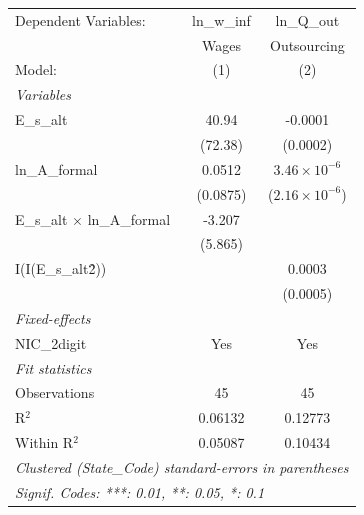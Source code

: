 
\begingroup
\centering
\begin{tabular}{lcc}
   \tabularnewline \midrule \midrule
   Dependent Variables:                  & ln\_w\_inf   & ln\_Q\_out\\    
                                         & Wages        & Outsourcing \\   
   Model:                                & (1)          & (2)\\  
   \midrule
   \emph{Variables}\\
   E\_s\_alt                             & 40.94        & -0.0001\\   
                                         & (72.38)      & (0.0002)\\   
   ln\_A\_formal                         & 0.0512       & $3.46\times 10^{-6}$\\    
                                         & (0.0875)     & ($2.16\times 10^{-6}$)\\    
   E\_s\_alt $\times$ ln\_A\_formal      & -3.207       &   \\   
                                         & (5.865)      &   \\   
   I(I(E\_s\_alt\^2))                    &              & 0.0003\\   
                                         &              & (0.0005)\\   
   \midrule
   \emph{Fixed-effects}\\
   NIC\_2digit                           & Yes          & Yes\\  
   \midrule
   \emph{Fit statistics}\\
   Observations                          & 45           & 45\\  
   R$^2$                                 & 0.06132      & 0.12773\\  
   Within R$^2$                          & 0.05087      & 0.10434\\  
   \midrule \midrule
   \multicolumn{3}{l}{\emph{Clustered (State\_Code) standard-errors in parentheses}}\\
   \multicolumn{3}{l}{\emph{Signif. Codes: ***: 0.01, **: 0.05, *: 0.1}}\\
\end{tabular}
\par\endgroup



